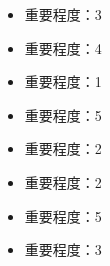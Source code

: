 \documentclass[letterpaper,10pt,english]{sphinxmanual}
\begin{document}
\sphinxAtStartPar
{}
\begin{itemize}
\item {} \begin{description}
\sphinxAtStartPar
重要程度：3

\end{description}

\item {} \begin{description}
\sphinxAtStartPar
重要程度：4

\end{description}

\item {} \begin{description}
\sphinxAtStartPar
重要程度：1

\end{description}

\item {} \begin{description}
\sphinxAtStartPar
重要程度：5

\end{description}

\item {} \begin{description}
\sphinxAtStartPar
重要程度：2

\end{description}

\item {} \begin{description}
\sphinxAtStartPar
重要程度：2

\end{description}

\item {} \begin{description}
\sphinxAtStartPar
重要程度：5

\end{description}

\item {} \begin{description}
\sphinxAtStartPar
重要程度：3

\end{description}


\end{itemize}
\end{document}
